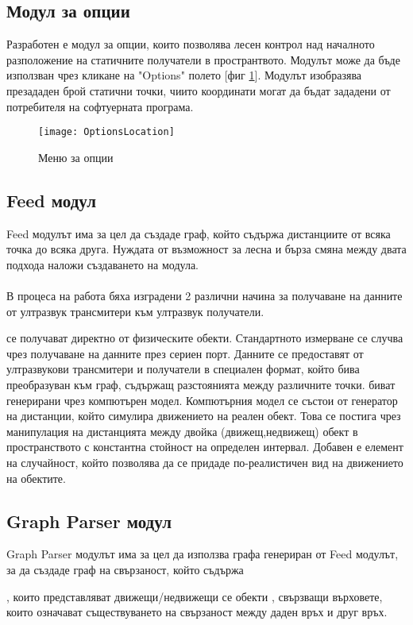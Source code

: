 \pagebreak

\subsection{Модул за опции}
Разработен е модул за опции, които позволява лесен контрол над началното разположение на статичните получатели в пространтвото. Модулът може да бъде използван чрез кликане на "Options" полето [фиг \ref{fig:options}]. Модулът изобразява презададен брой статични точки, чиито координати могат да бъдат зададени от потребителя на софтуерната програма. 

\begin{figure}
   \texttt{[image: OptionsLocation]}
    \caption{Меню за опции}
    \label{fig:options}
\end{figure}

\pagebreak

\subsection{Feed модул}
Feed модулът има за цел да създаде граф, който съдържа дистанциите от всяка точка до всяка друга. Нуждата от възможност за лесна и бърза смяна между двата подхода наложи създаването на модула.\\\\
В процеса на работа бяха изградени 2 различни начина за получаване на данните от ултразвук трансмитери към ултразвук получатели. 
\begin{enumerate}
     се получават директно от физическите обекти. Стандартното измерване се случва чрез получаване на данните през сериен порт. Данните се предоставят от ултразвукови трансмитери и получатели в специален формат, който бива преобразуван към граф, съдържащ разстоянията между различните точки.
     биват генерирани чрез компютърен модел. Компютърния модел се състои от генератор на дистанции, който симулира движението на реален обект. Това се постига чрез манипулация на дистанцията между двойка (движещ,недвижещ) обект в пространството с константна стойност на определен интервал. Добавен е елемент на случайност, който позволява да се придаде по-реалистичен вид на движението на обектите.
\end{enumerate}

\pagebreak

\subsection{Graph Parser модул}
Graph Parser модулът има за цел да използва графа генериран от Feed модулът, за да създаде граф на свързаност, който съдържа
\begin{enumerate}
, които представляват движещи/недвижещи се обекти 
, свързващи върховете, които означават съществуването на свързаност между
даден връх и друг връх.
\end{enumerate}

